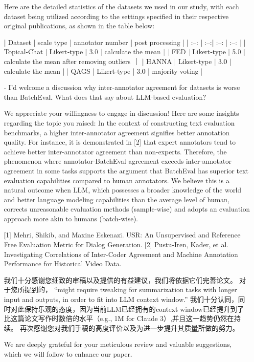 Here are the detailed statistics of the datasets we used in our study, with each dataset being utilized according to the settings specified in their respective original publications, as shown in the table below:

| Dataset      |  scale type | annotator number | post processing |
| :--: | :--:| :--: | :--: |
| Topical-Chat  | Likert-type | 3.0 | calculate the mean |
| FED     |   Likert-type |  5.0  | calculate the mean after removing outliers ｜
| HANNA      |    Likert-type | 3.0  | calculate the mean |
| QAGS      |    Likert-type | 3.0  | majority voting |

- I'd welcome a discussion why inter-annotator agreement for datasets is worse than BatchEval. What does that say about LLM-based evaluation?

We appreciate your willingness to engage in discussion! Here are some insights regarding the topic you raised: In the context of constructing text evaluation benchmarks, a higher inter-annotator agreement signifies better annotation quality. For instance, it is demonstrated in [2] that expert annotators tend to achieve better inter-annotator agreement than non-experts. Therefore, the phenomenon where annotator-BatchEval agreement exceeds inter-annotator agreement in some tasks supports the argument that BatchEval has superior text evaluation capabilities compared to human annotators. We believe this is a natural outcome when LLM, which possesses a broader knowledge of the world and better language modeling capabilities than the average level of human, corrects unreasonable evaluation methods (sample-wise) and adopts an evaluation approach more akin to humans (batch-wise).

[1] Mehri, Shikib, and Maxine Eskenazi. USR: An Unsupervised and Reference Free Evaluation Metric for Dialog Generation.
[2] Pustu-Iren, Kader, et al. Investigating Correlations of Inter-Coder Agreement and Machine Annotation Performance for Historical Video Data.


我们十分感谢您细致的审稿以及提供的有益建议，我们将依据它们完善论文。
对于您所提到的，
“might require tweaking for summarization tasks with longer input and outputs, in order to fit into LLM context window.”
我们十分认同，同时对此保持乐观的态度，因为当前LLM已经拥有的context window已经提升到了比这篇论文写作时数倍的水平（e.g., 1M for Claude 3）,并且这一趋势仍然在持续。
再次感谢您对我们手稿的高度评价以及为进一步提升其质量所做的努力。

We are deeply grateful for your meticulous review and valuable suggestions, which we will follow to enhance our paper.

